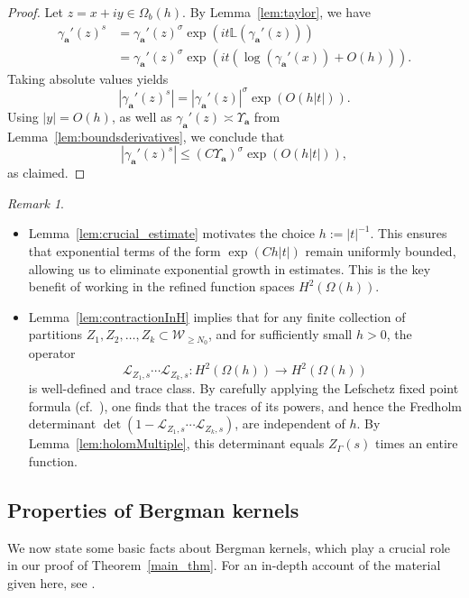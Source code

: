 \documentclass[12pt,letterpaper]{amsart}
\theoremstyle{plain}
\theoremstyle{definition}
\theoremstyle{remark}
\newtheorem{remark}[prop]{Remark}
\newcommand{\Aa}{\textbf{a}}
\begin{document}
\begin{proof}
Let $z = x + i y \in \Omega_b(h)$. By Lemma~\ref{lem:taylor}, we have
\begin{align*}
\gamma_{\Aa}'(z)^s &= \gamma_{\Aa}'(z)^{\sigma} \exp\left(i t \mathbb{L}(\gamma_{\Aa}'(z))\right) \\
&= \gamma_{\Aa}'(z)^{\sigma} \exp\left(i t \left(\log(\gamma_{\Aa}'(x)) +  O(h)\right)\right).
\end{align*}
Taking absolute values yields
\[
|\gamma_{\Aa}'(z)^s| = |\gamma_{\Aa}'(z)|^{\sigma} \exp\left(O(h |t|)\right).
\]
Using $|y| = O(h)$, as well as $\gamma_{\Aa}'(z) \asymp \Upsilon_{\Aa}$ from Lemma~\ref{lem:boundsderivatives}, we conclude that
\[
|\gamma_{\Aa}'(z)^s| \le (C \Upsilon_{\Aa})^{\sigma} \exp(O(h |t|)),
\]
as claimed.
\end{proof}


\begin{remark}
\begin{itemize}
\item Lemma~\ref{lem:crucial_estimate} motivates the choice $h := |t|^{-1}$. This ensures that exponential terms of the form $\exp(C h |t|)$ remain uniformly bounded, allowing us to eliminate exponential growth in estimates. This is the key benefit of working in the refined function spaces $H^2(\Omega(h))$.

\item Lemma~\ref{lem:contractionInH} implies that for any finite collection of partitions $Z_1, Z_2, \dots, Z_k \subset \mathcal{W}_{\ge N_0}$, and for sufficiently small $h > 0$, the operator
\[
\mathcal{L}_{Z_1,s} \cdots \mathcal{L}_{Z_k,s} \colon H^2(\Omega(h)) \to H^2(\Omega(h))
\]
is well-defined and trace class. By carefully applying the Lefschetz fixed point formula (cf.~\cite[Lemma~15.9]{Borthwick_book}), one finds that the traces of its powers, and hence the Fredholm determinant $\det(1 - \mathcal{L}_{Z_1,s} \cdots \mathcal{L}_{Z_k,s})$, are independent of $h$. By Lemma~\ref{lem:holomMultiple}, this determinant equals $Z_\Gamma(s)$ times an entire function.
\end{itemize}
\end{remark}



\subsection{Properties of Bergman kernels}\label{sec:Bergman}
We now state some basic facts about Bergman kernels, which play a crucial role in our proof of Theorem~\ref{main_thm}. For an in-depth account of the material given here, see \cite{Krantz}.
\end{document}
